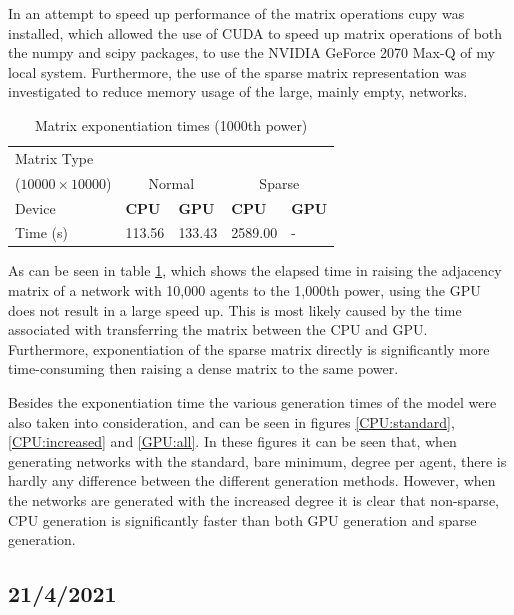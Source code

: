 \documentclass{article}
\begin{document}
In an  attempt to speed up performance of the matrix operations cupy was installed, which allowed the use of CUDA to speed up matrix operations of both the numpy and scipy packages, to use the NVIDIA GeForce 2070 Max-Q of my local system. Furthermore, the use of the sparse matrix representation was investigated to reduce memory usage of the large, mainly empty, networks.

\begin{table}[H]
    \centering
    \begin{tabular}{lllll}
        \toprule
        Matrix Type\\ ($10000 \times 10000$) & \multicolumn{2}{c}{Normal} & \multicolumn{2}{c}{Sparse}\\
        \midrule 
        Device &\textbf{CPU} & \textbf{GPU} & \textbf{CPU} & \textbf{GPU} \\
        \midrule
        Time (s) & 113.56 & 133.43 & 2589.00 & - \\
        \bottomrule
    \end{tabular}
    \label{table:exp_time}
    \caption{Matrix exponentiation times (1000th power)}
\end{table}

As can be seen in table \ref{table:exp_time}, which shows the elapsed time in raising the adjacency matrix of a network with 10,000 agents to the 1,000th power, using the GPU does not result in a large speed up. This is most likely caused by the time associated with transferring the matrix between the CPU and GPU. Furthermore, exponentiation of the sparse matrix directly is significantly more time-consuming then raising a dense matrix to the same power.

Besides the exponentiation time the various generation times of the model were also taken into consideration, and can be seen in figures \ref{CPU:standard}, \ref{CPU:increased} and \ref{GPU:all}.
In these figures it can be seen that, when generating networks with the standard, bare minimum, degree per agent, there is hardly any difference between the different generation methods. However, when the networks are generated with the increased degree it is clear that non-sparse, CPU generation is significantly faster than both GPU generation and sparse generation.

\newpage

\subsection{21/4/2021}
\end{document}

